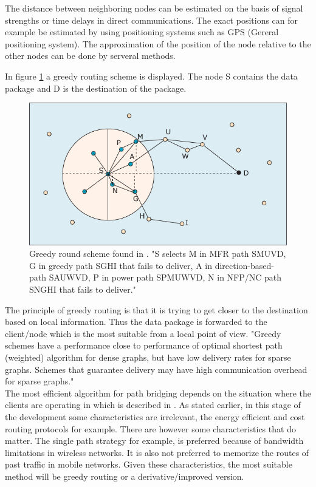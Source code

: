 \documentclass[10pt,a4paper]{article}
\begin{document}
The distance between neighboring nodes can be estimated on the basis of signal strengths or time delays in direct communications. The exact positions can for example be estimated by using positioning systems such as GPS (Gereral positioning system). \cite{locationsystemsforubiquitouscomputing} The approximation of the position of the node relative to the other nodes can be done by serveral methods.

In figure \ref{fig:greedyrouting} a greedy routing scheme is displayed. The node S contains the data package and D is the destination of the package. 

\begin{figure}[H]
   \centering
   \includegraphics[width=1\textwidth]{greedyrouting}
   \caption{Greedy round scheme found in \cite{position-based}. "S selects M in MFR path SMUVD, G in greedy path SGHI that
fails to deliver, A in direction-based-path SAUWVD, P in power path
SPMUWVD, N in NFP/NC path SNGHI that fails to deliver."}
   \label{fig:greedyrouting}
\end{figure}

The principle of greedy routing is that it is trying to get closer to the destination based on local information. Thus the data package is forwarded to the client/node which is the most suitable from a local point of view. \cite{geographicrouting} "Greedy schemes have a performance close to performance of optimal shortest path (weighted) algorithm for dense graphs, but have low delivery rates for sparse graphs. Schemes that guarantee delivery may have high communication overhead for sparse graphs." \cite{position-based}\cite{positionbasedroutingtaxonomy} \\

The most efficient algorithm for path bridging depends on the situation where the clients are operating in which is described in \cite{position-based}\cite{positionbasedroutingtaxonomy}. As stated earlier, in this stage of the development some characteristics are irrelevant, the energy efficient and cost routing protocols for example. There are however some characteristics that do matter. The single path strategy for example, is preferred because of bandwidth limitations in wireless networks. It is also not preferred to memorize the routes of past traffic in mobile networks.\cite{position-based} \cite{positionbasedroutingtaxonomy} Given these characteristics, the most suitable method will be greedy routing or a derivative/improved version.
\end{document}
